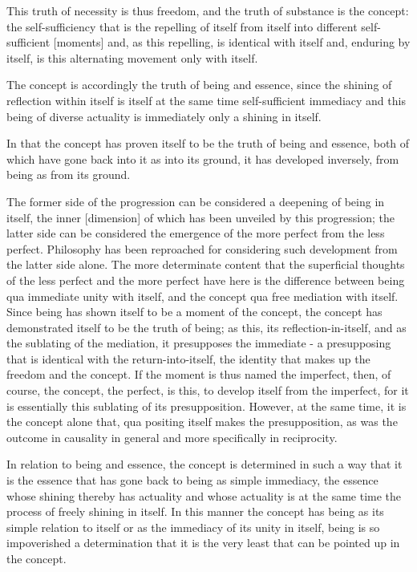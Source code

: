 {This truth of necessity is thus freedom, and
the truth of substance is the concept:
the self-sufficiency that is the repelling of itself from itself into
different self-sufficient [moments] and, as this repelling, is
identical with itself and, enduring by itself, is
this alternating movement only with itself.

The concept is accordingly the truth of being and essence,
since the shining of reflection within itself is
itself at the same time self-sufficient immediacy
and this being of diverse actuality is immediately
only a shining in itself.

    In that the concept has proven itself to be
    the truth of being and essence,
    both of which have gone back into it
    as into its ground, it has developed inversely,
    from being as from its ground.

    The former side of the progression can be considered
    a deepening of being in itself,
    the inner [dimension] of which has been unveiled by this progression;
    the latter side can be considered the emergence of the more perfect
    from the less perfect.
    Philosophy has been reproached for considering
    such development from the latter side alone.
    The more determinate
    content that the superficial thoughts of the less perfect and the more
    perfect have here is the difference between being qua immediate
    unity with itself, and the concept qua free mediation with itself.
    Since being has shown itself to be a moment of the concept,
    the concept has demonstrated itself to be the truth of being;
    as this, its reflection-in-itself, and as the sublating of the mediation,
    it presupposes the immediate - a presupposing that is identical with
    the return-into-itself, the identity that makes up the freedom and
    the concept.
    If the moment is thus named the imperfect, then,
    of course, the concept, the perfect, is this, to develop itself from
    the imperfect, for it is essentially this sublating of its presupposition.
    However, at the same time, it is the concept alone that,
    qua positing itself makes the presupposition,
    as was the outcome in causality in general and
    more specifically in reciprocity.

    In relation to being and essence, the concept is determined
    in such a way that it is the essence that has gone back to being
    as simple immediacy, the essence whose shining thereby has actuality and
    whose actuality is at the same time the process of freely shining in itself.
    In this manner the concept has being as its simple relation
    to itself or as the immediacy of its unity in itself,
    being is so impoverished a determination that it is
    the very least that can be pointed up in the concept.

}

